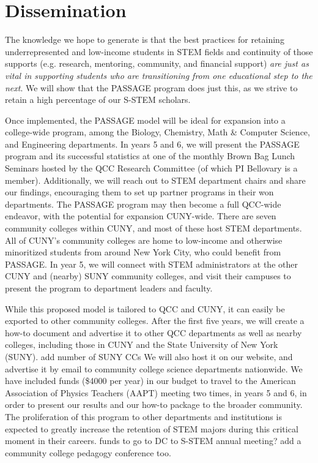 \documentclass[12pt]{article}
\newcommand\new[1]{{\color{blue}#1}}
\begin{document}
\section{Dissemination}

The knowledge we hope to generate is that the best practices for retaining underrepresented and low-income students in STEM fields and continuity of those supports (e.g. research, mentoring, community, and financial support) {\em are just as vital in supporting students who are transitioning from one educational step to the next}.  We will show that the PASSAGE program does just this, as we strive to retain a high percentage of our S-STEM scholars.

Once implemented, the PASSAGE model will be ideal for expansion into a college-wide program, among the Biology, Chemistry, Math \& Computer Science, and Engineering departments. \new{ In years 5 and 6, we will present the PASSAGE program and its successful statistics at one of the monthly Brown Bag Lunch Seminars hosted by the QCC Research Committee (of which PI Bellovary is a member).  Additionally, we will reach out to STEM department chairs and share our findings, encouraging them to set up partner programs in their won departments.   } The PASSAGE program may then become a full QCC-wide endeavor, with the potential for expansion CUNY-wide.  There are seven community colleges within CUNY, and most of these host STEM departments.   All of CUNY's community colleges are home to low-income and otherwise minoritized students from around New York City, who could benefit from PASSAGE.  \new{In year 5, we will connect with STEM administrators at the other CUNY and (nearby) SUNY community colleges, and visit their campuses to present the program to department leaders and faculty.}

While this proposed model is tailored to QCC and CUNY, it can easily be exported to other community colleges.  After the first five years, we will create a how-to document and advertise it to other QCC departments as well as nearby colleges, including those in CUNY and the State University of New York (SUNY). \new{add number of SUNY CCs} We will also host it on our website, and advertise it by email to community college science departments nationwide.  We have included funds (\$4000 per year) in our budget to travel to the American Association of Physics Teachers (AAPT) meeting two times, in years 5 and 6, in order to present our results and our how-to package to the broader community.  The proliferation of this program to other departments and institutions is expected to greatly increase the retention of STEM majors during this critical moment in their careers.  \new{funds to go to DC to S-STEM annual meeting?  add a community college pedagogy conference too.}
\end{document}
